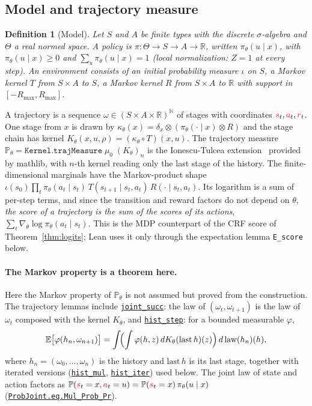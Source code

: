 \documentclass[11pt,a4paper]{article}
\newcommand{\lmod}[2]{\href{http://www.lemma.cn/lean/?module=#2}{\nolinkurl{#1}}}
\newtheorem{definition}[theorem]{Definition}
\newcommand{\R}{\mathbb{R}}
\newcommand{\N}{\mathbb{N}}
\newcommand{\E}{\mathbb{E}}
\newcommand{\Prb}{\mathbb{P}}
\newcommand{\rv}[1]{{\color{red}#1}}       %
\newcommand{\sv}{\rv{s}}
\newcommand{\av}{\rv{a}}
\newcommand{\rw}{\rv{r}}
\newcommand{\grad}{\nabla_{\theta}}
\begin{document}
\subsection{Model and trajectory measure}
\label{sec:mdp}
\begin{definition}[Model]
\label{def:model}
Let $S$ and $A$ be finite types with the discrete $\sigma$-algebra and $\Theta$ a real normed space.
A \emph{policy} is $\pi:\Theta\to S\to A\to\R$, written $\pi_\theta(u\mid x)$, with $\pi_\theta(u\mid x)\ge0$ and $\sum_u\pi_\theta(u\mid x)=1$ (local normalization: $Z=1$ at every step).
An \emph{environment} consists of an initial probability measure $\iota$ on $S$, a Markov kernel $T$ from $S\times A$ to $S$, a Markov kernel $R$ from $S\times A$ to $\R$ with support in $[-R_{\max},R_{\max}]$.
\end{definition}
A trajectory is a sequence $\omega\in(S\times A\times\R)^{\N}$ of stages with coordinates $\sv_t,\av_t,\rw_t$.
One stage from $x$ is drawn by $\kappa_\theta(x)=\delta_x\otimes(\pi_\theta(\cdot\mid x)\otimes R)$ and the stage chain has kernel $K_\theta(x,u,\rho)=(\kappa_\theta\circ T)(x,u)$.
The trajectory measure $\Prb_\theta=\mathtt{Kernel.trajMeasure}\;\mu_0\;(K_\theta)_n$ is the Ionescu-Tulcea extension~\cite{kallenberg2002foundations} provided by mathlib, with $n$-th kernel reading only the last stage of the history.
The finite-dimensional marginals have the Markov-product shape $\iota(s_0)\prod_t\pi_\theta(a_t\mid s_t)\,T(s_{t+1}\mid s_t,a_t)\,R(\cdot\mid s_t,a_t)$.
Its logarithm is a sum of per-step terms, and since the transition and reward factors do not depend on $\theta$, \emph{the score of a trajectory is the sum of the scores of its actions}, $\sum_t\grad\log\pi_\theta(a_t\mid s_t)$.
This is the MDP counterpart of the CRF score of Theorem~\ref{thm:logits}; Lean uses it only through the expectation lemma \texttt{E\_score} below.

\paragraph{The Markov property is a theorem here.}
Here the Markov property of $\Prb_\theta$ is not assumed but proved from the construction.
The trajectory lemmas include \lmod{joint_succ}{Random.Map}: the law of $(\omega_t,\omega_{t+1})$ is the law of $\omega_t$ composed with the kernel $K_\theta$, and \lmod{hist_step}{Random.Integral.of.All_LeNorm.StronglyMeasurable.history}: for a bounded measurable $\varphi$,
\[
\E\bigl[\varphi(h_n,\omega_{n+1})\bigr]=\int\!\Bigl(\int\varphi(h,z)\,dK_\theta(\mathrm{last}\,h)(z)\Bigr)\,d\,\mathrm{law}(h_n)(h),
\]
where $h_n=(\omega_0,\dots,\omega_n)$ is the history and $\mathrm{last}\,h$ is its last stage, together with iterated versions (\lmod{hist_mul}{Random.Integral_Mul.eq.Integral_Mul_Integral.of.All_LeNorm.StronglyMeasurable.All_LeNorm.StronglyMeasurable}, \lmod{hist_iter}{Random.All_EqIntegral_MulGIntegral_MulGKf.of.All_LeNorm.StronglyMeasurable}) used below.
The joint law of state and action factors as $\Prb(\sv_t=x,\av_t=u)=\Prb(\sv_t=x)\,\pi_\theta(u\mid x)$ (\lmod{ProbJoint.eq.Mul_Prob_Pr}{Random.ProbJoint.eq.Mul_Prob_Pr}).
\end{document}
